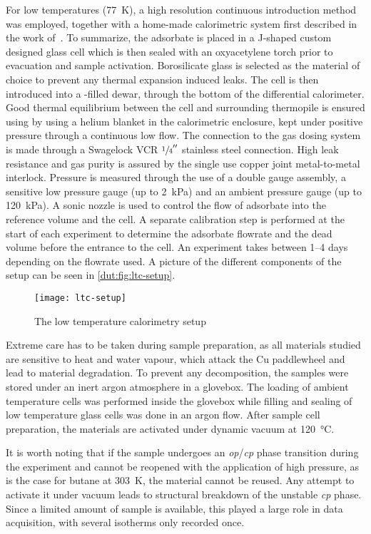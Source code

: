 For low temperatures (\SI{77}{\kelvin}), a high resolution continuous
introduction method was employed, together with a home-made 
calorimetric system first described in the work 
of~\citet{rouquerolCalorimetricEvidenceBidimensional1977}. To summarize,
the adsorbate is placed in a J-shaped custom designed glass cell which is
then sealed with an oxyacetylene torch prior to evacuation and sample 
activation. Borosilicate glass is selected as
the material of choice to prevent any thermal expansion induced leaks.
The cell is then introduced into a -filled dewar, through 
the bottom of the differential calorimeter. Good thermal equilibrium
between the cell and surrounding thermopile is ensured using by 
using a helium blanket in the calorimetric enclosure, kept under 
positive pressure through a continuous low flow. The connection to the 
gas dosing system is made through a Swagelock VCR \(\sfrac{1}{4}''\)
stainless steel connection. High leak resistance and gas purity 
is assured by the single use copper joint metal-to-metal interlock.
Pressure is measured through the use of a double gauge assembly,
a sensitive low pressure gauge (up to \SI{2}{\kilo\pascal}) and 
an ambient pressure gauge (up to \SI{120}{\kilo\pascal}).
A sonic nozzle is used to control the flow of adsorbate into the 
reference volume and the cell. A separate calibration step is 
performed at the start of each experiment to determine the adsorbate
flowrate and the dead volume before the entrance to the cell.
An experiment takes between 1--4 days depending 
on the flowrate used. A picture of the different components of the 
setup can be seen in \autoref{dut:fig:ltc-setup}.

\begin{figure}[htb]
    \centering
    \texttt{[image: ltc-setup]}%
    \caption{The low temperature calorimetry setup}%
    \label{dut:fig:ltc-setup}
\end{figure}

Extreme care has to be taken during sample preparation, as all materials 
studied are sensitive to heat and water vapour, which attack
the Cu paddlewheel and lead to material degradation. To prevent any 
decomposition, the samples were stored under an inert argon 
atmosphere in a glovebox. The loading of ambient temperature 
cells was performed inside the glovebox while filling and sealing 
of low temperature glass cells was done in an argon flow. After 
sample cell preparation, the materials are activated under 
dynamic vacuum at \SI{120}{\degreeCelsius}. 

It is worth noting that if the sample undergoes an \textit{op}/\textit{cp}
phase transition during the experiment and cannot be reopened with
the application of high pressure, as is the case for butane at 
\SI{303}{\kelvin}, the material cannot be reused. Any attempt to
activate it under vacuum leads to structural breakdown of the 
unstable \textit{cp} phase. 
Since a limited amount of sample is available, this played a large
role in data acquisition, with several isotherms only recorded once.
